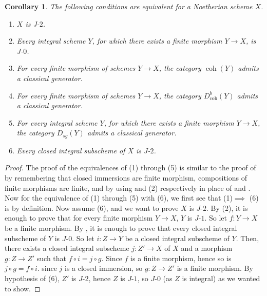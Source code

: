\documentclass[11pt]{amsart}
\theoremstyle{plain}
\newtheorem{corollary}[theorem]{Corollary}
\theoremstyle{definition}
\numberwithin{equation}{section}
\numberwithin{theorem}{section}
\begin{document}
\begin{corollary}\label{J2 crit} The following conditions are equivalent for a Noetherian scheme $X$. 

\begin{enumerate}
    \item $X$ is J-$2$.

    \item Every integral scheme $Y$, for which there exists a finite morphism $Y\to X$, is J-$0$. 

    \item For every finite morphism of schemes $Y\to X$, the  category $\operatorname{coh}(Y)$ admits a classical generator. 

    \item For every finite morphism of schemes $Y\to X$, the  category $D^b_{\operatorname{coh}}(Y)$ admits a classical generator. 

    \item For every integral scheme $Y$, for which there exists a finite morphism $Y\to X$, the category $D_{sg}(Y)$ admits a classical generator. 

    \item Every closed integral subscheme of $X$ is J-$2$. 
\end{enumerate}
    
\end{corollary}

\begin{proof} The proof of the equivalences of (1) through (5) is similar to the proof of \cite[Proposition 2.8]{Iyengar/Takahashi:2019} by remembering that closed immersions are finite morphism, compositions of finite morphisms are finite, and by using  and (2) respectively in place of \cite[Theorem 1.1]{Iyengar/Takahashi:2019} and \cite[Lemma 2.6]{Iyengar/Takahashi:2019}. Now for the equivalence of (1) through (5) with (6), we first see that (1)$\implies$ (6) is by definition. Now assume (6), and we want to prove $X$ is $J\textrm{-}2$. By (2), it is enough to prove that for every finite morphism $Y\to X$, $Y$ is $J\textrm{-}1$. So let $f:Y\to X$ be a finite morphism. By , it is enough to prove that every closed integral subscheme of $Y$ is $J\textrm{-}0$. So let $i:Z\to Y$ be a closed integral subscheme of $Y$.  Then, there exists a closed integral subscheme $j : Z' \to X$ of $X$ and a morphism $g:Z \to Z'$ such that $f\circ i=j\circ g$. Since $f$ is a finite morphism, hence so is $j\circ g=f\circ i$. since $j$ is a closed immersion, so $g: Z\to Z'$ is a finite morphism. By hypothesis of (6), $Z'$ is $J\textrm{-}2$, hence $Z$ is $J\textrm{-}1$, so $J\textrm{-}0$ (as $Z$ is integral) as we wanted to show. 
\end{proof}
\end{document}
